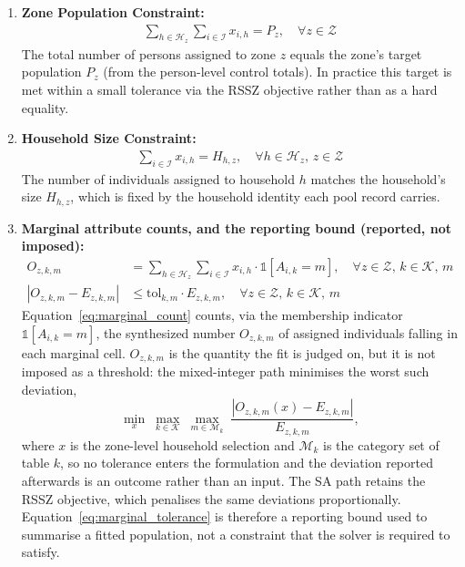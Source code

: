 \begin{enumerate}[label=\textbf{C\arabic*}, ref=C\arabic*]

    \item \textbf{Zone Population Constraint:}
    \begin{align}
        \sum_{h \in \mathcal{H}_z} \sum_{i \in \mathcal{I}} x_{i,h} = P_z, \quad \forall z \in \mathcal{Z}
        \label{eq:zone_population}
    \end{align}
    The total number of persons assigned to zone \( z \) equals the zone's target population \( P_z \) (from the person-level control totals). In practice this target is met within a small tolerance via the RSSZ objective rather than as a hard equality.

    \item \textbf{Household Size Constraint:}
    \begin{align}
        \sum_{i \in \mathcal{I}} x_{i,h} = H_{h,z}, \quad \forall h \in \mathcal{H}_z, \, z \in \mathcal{Z}
        \label{eq:household_size}
    \end{align}
    The number of individuals assigned to household \( h \) matches the household's size \( H_{h,z} \), which is fixed by the household identity each pool record carries.

    \item \textbf{Marginal attribute counts, and the reporting bound (reported, not imposed):}
    \begin{align}
        O_{z,k,m} &= \sum_{h \in \mathcal{H}_z} \sum_{i \in \mathcal{I}} x_{i,h} \cdot \mathbb{1}[A_{i,k} = m], \quad \forall z \in \mathcal{Z}, \, k \in \mathcal{K}, \, m \label{eq:marginal_count} \\
        \left| O_{z,k,m} - E_{z,k,m} \right| &\leq \text{tol}_{k,m} \cdot E_{z,k,m}, \quad \forall z \in \mathcal{Z}, \, k \in \mathcal{K}, \, m \label{eq:marginal_tolerance}
    \end{align}
    Equation~\eqref{eq:marginal_count} counts, via the membership indicator \( \mathbb{1}[A_{i,k}=m] \), the synthesized number \( O_{z,k,m} \) of assigned individuals falling in each marginal cell. \( O_{z,k,m} \) is the quantity the fit is judged on, but it is not imposed as a threshold: the mixed-integer path minimises the worst such deviation,
\[
  \min_{x} \; \max_{k \in \mathcal{K}} \; \max_{m \in \mathcal{M}_k} \;
  \frac{\left| O_{z,k,m}(x) - E_{z,k,m} \right|}{E_{z,k,m}},
\]
where \( x \) is the zone-level household selection and \( \mathcal{M}_k \) is the category set of table \( k \), so no tolerance enters the formulation and the deviation reported afterwards is an outcome rather than an input. The SA path retains the RSSZ objective, which penalises the same deviations proportionally. Equation~\eqref{eq:marginal_tolerance} is therefore a reporting bound used to summarise a fitted population, not a constraint that the solver is required to satisfy.


\end{enumerate}
